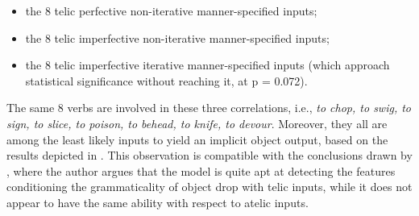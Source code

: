 \begin{itemize}
    \item the 8 telic perfective non-iterative manner-specified inputs;
    \item the 8 telic imperfective non-iterative manner-specified inputs;
    \item the 8 telic imperfective iterative manner-specified inputs (which approach statistical significance without reaching it, at p = 0.072).
\end{itemize}

The same 8 verbs are involved in these three correlations, i.e., \textit{to chop, to swig, to sign, to slice, to poison, to behead, to knife, to devour}. Moreover, they all are among the least likely inputs to yield an implicit object output, based on the results depicted in . This observation is compatible with the conclusions drawn by \textcite[150-152]{Medina2007}, where the author argues that the model is quite apt at detecting the features conditioning the grammaticality of object drop with telic inputs, while it does not appear to have the same ability with respect to atelic inputs.

